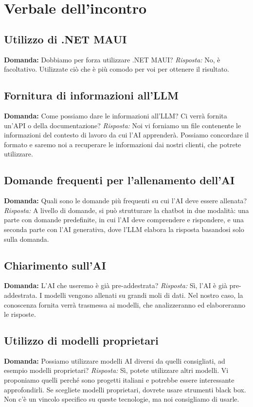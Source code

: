 \documentclass{article}
\begin{document}
\section{Verbale dell'incontro}

\subsection{Utilizzo di .NET MAUI}
\textbf{Domanda:} Dobbiamo per forza utilizzare .NET MAUI? \newline
\textit{Risposta:} No, è facoltativo. Utilizzate ciò che è più comodo per voi per ottenere il risultato.

\subsection{Fornitura di informazioni all'LLM}
\textbf{Domanda:} Come possiamo dare le informazioni all'LLM? Ci verrà fornita un'API o della documentazione? \newline
\textit{Risposta:} Noi vi forniamo un file contenente le informazioni del contesto di lavoro da cui l'AI apprenderà. Possiamo concordare il formato e saremo noi a recuperare le informazioni dai nostri clienti, che potrete utilizzare.

\subsection{Domande frequenti per l'allenamento dell'AI}
\textbf{Domanda:} Quali sono le domande più frequenti su cui l'AI deve essere allenata? \newline
\textit{Risposta:} A livello di domande, si può strutturare la chatbot in due modalità: una parte con domande predefinite, in cui l'AI deve comprendere e rispondere, e una seconda parte con l'AI generativa, dove l'LLM elabora la risposta basandosi solo sulla domanda.

\subsection{Chiarimento sull'AI}
\textbf{Domanda:} L'AI che useremo è già pre-addestrata? \newline
\textit{Risposta:} Sì, l'AI è già pre-addestrata. I modelli vengono allenati su grandi moli di dati. Nel nostro caso, la conoscenza fornita verrà trasmessa ai modelli, che analizzeranno ed elaboreranno le risposte.

\subsection{Utilizzo di modelli proprietari}
\textbf{Domanda:} Possiamo utilizzare modelli AI diversi da quelli consigliati, ad esempio modelli proprietari? \newline
\textit{Risposta:} Sì, potete utilizzare altri modelli. Vi proponiamo quelli perché sono progetti italiani e potrebbe essere interessante approfondirli. Se scegliete modelli proprietari, dovrete usare strumenti black box. Non c'è un vincolo specifico su queste tecnologie, ma noi consigliamo di usarle.
\end{document}
